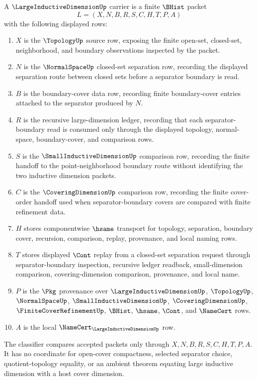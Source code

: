 \begin{definition}
\label{def:large-inductive-dimension-carrier}
A $\LargeInductiveDimensionUp$ carrier is a finite $\BHist$ packet
$$
L=(X,N,B,R,S,C,H,T,P,A)
$$
with the following displayed rows:
\begin{enumerate}
\item $X$ is the $\TopologyUp$ source row, exposing the finite open-set, closed-set, neighborhood, and boundary observations inspected by the packet.
\item $N$ is the $\NormalSpaceUp$ closed-set separation row, recording the displayed separation route between closed sets before a separator boundary is read.
\item $B$ is the boundary-cover data row, recording finite boundary-cover entries attached to the separator produced by $N$.
\item $R$ is the recursive large-dimension ledger, recording that each separator-boundary read is consumed only through the displayed topology, normal-space, boundary-cover, and comparison rows.
\item $S$ is the $\SmallInductiveDimensionUp$ comparison row, recording the finite handoff to the point-neighborhood boundary route without identifying the two inductive dimension packets.
\item $C$ is the $\CoveringDimensionUp$ comparison row, recording the finite cover-order handoff used when separator-boundary covers are compared with finite refinement data.
\item $H$ stores componentwise $\hsame$ transport for topology, separation, boundary cover, recursion, comparison, replay, provenance, and local naming rows.
\item $T$ stores displayed $\Cont$ replay from a closed-set separation request through separator-boundary inspection, recursive ledger readback, small-dimension comparison, covering-dimension comparison, provenance, and local name.
\item $P$ is the $\Pkg$ provenance over $\LargeInductiveDimensionUp$, $\TopologyUp$, $\NormalSpaceUp$, $\SmallInductiveDimensionUp$, $\CoveringDimensionUp$, $\FiniteCoverRefinementUp$, $\BHist$, $\hsame$, $\Cont$, and $\NameCert$ rows.
\item $A$ is the local $\NameCert_{\LargeInductiveDimensionUp}$ row.
\end{enumerate}
The classifier compares accepted packets only through $X,N,B,R,S,C,H,T,P,A$. It has no coordinate for open-cover compactness, selected separator choice, quotient-topology equality, or an ambient theorem equating large inductive dimension with a host cover dimension.
\end{definition}

